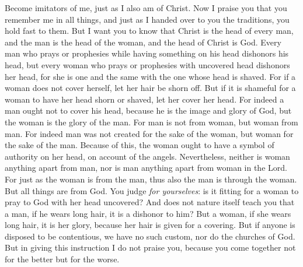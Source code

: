 \begin{biblechapter} %
 Become imitators of me, just as I also am of Christ.
\verse Now I praise you that you remember me in all things, and just as I handed over to you the traditions, you hold fast to them.
\verse But I want you to know that Christ is the head of every man, and the man is the head of the woman, and the head of Christ is God.
\verse Every man who prays or prophesies while having something on his head dishonors his head,
\verse but every woman who prays or prophesies with uncovered head dishonors her head, for she is one and the same with the one whose head is shaved.
\verse For if a woman does not cover herself, let her hair be shorn off. But if it is shameful for a woman to have her head shorn or shaved, let her cover her head.
\verse For indeed a man ought not to cover his head, because he is the image and glory of God, but the woman is the glory of the man.
\verse For man is not from woman, but woman from man.
\verse For indeed man was not created for the sake of the woman, but woman for the sake of the man.
\verse Because of this, the woman ought to have a symbol of authority on her head, on account of the angels.
\verse Nevertheless, neither is woman anything apart from man, nor is man anything apart from woman in the Lord.
\verse For just as the woman is from the man, thus also the man is through the woman. But all things are from God.
\verse You judge \textit{for yourselves}: is it fitting for a woman to pray to God with her head uncovered?
\verse And does not nature itself teach you that a man, if he wears long hair, it is a dishonor to him?
\verse But a woman, if she wears long hair, it is her glory, because her hair is given for a covering.
\verse But if anyone is disposed to be contentious, we have no such custom, nor do the churches of God.
 But in giving this instruction I do not praise you, because you come together not for the better but for the worse.

\end{biblechapter}
